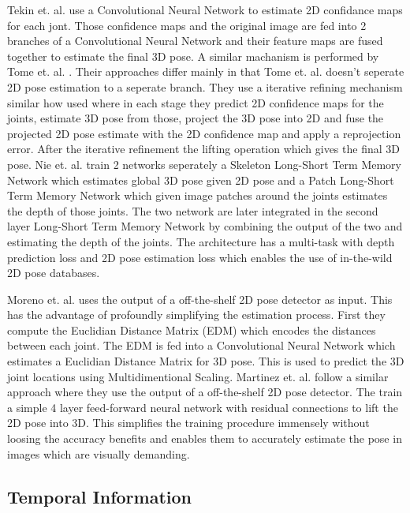 Tekin et. al. \parencite{tekin2017learning} use a Convolutional Neural Network to estimate 2D confidance maps for each jont. Those confidence maps and the original image are fed into 2 branches of a Convolutional Neural Network and their feature maps are fused together to estimate the final 3D pose. A similar machanism is performed by Tome et. al. \parencite{tome2017lifting}. Their approaches differ mainly in that Tome et. al. doesn't seperate 2D pose estimation to a seperate branch. They use a iterative refining mechanism similar how \parencite{newell2016stacked} used where in each stage they predict 2D confidence maps for the joints, estimate 3D pose from those, project the 3D pose into 2D and fuse the projected 2D pose estimate with the 2D confidence map and apply a reprojection error. After the iterative refinement the lifting operation which gives the final 3D pose. Nie et. al. \parencite{nie2017monocular} train 2 networks seperately a Skeleton Long-Short Term Memory Network \parencite{hochreiter1997long} which estimates global 3D pose given 2D pose and a Patch Long-Short Term Memory Network which given image patches around the joints estimates the depth of those joints. The two network are later integrated in the second layer Long-Short Term Memory Network by combining the output of the two and estimating the depth of the joints. The architecture has a multi-task with depth prediction loss and 2D pose estimation loss which enables the use of in-the-wild 2D pose databases. 

Moreno et. al. \parencite{moreno20173d} uses the output of a off-the-shelf 2D pose detector as input. This has the advantage of profoundly simplifying the estimation process. First they compute the Euclidian Distance Matrix (EDM) which encodes the distances between each joint. The EDM is fed into a Convolutional Neural Network which estimates a Euclidian Distance Matrix for 3D pose. This is used to predict the 3D joint locations using Multidimentional Scaling. Martinez et. al. \parencite{martinez2017simple} follow a similar approach where they use the output of a off-the-shelf 2D pose detector. The train a simple 4 layer feed-forward neural network with residual connections to lift the 2D pose into 3D. This simplifies the training procedure immensely without loosing the accuracy benefits and enables them to accurately estimate the pose in images which are visually demanding.

\subsection{Temporal Information}

